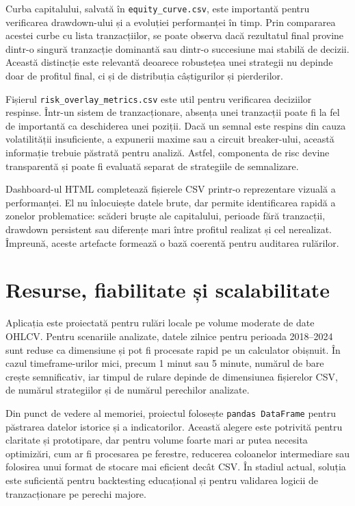 Curba capitalului, salvată în \texttt{equity\_curve.csv}, este importantă pentru verificarea drawdown-ului și a evoluției performanței în timp. Prin compararea acestei curbe cu lista tranzacțiilor, se poate observa dacă rezultatul final provine dintr-o singură tranzacție dominantă sau dintr-o succesiune mai stabilă de decizii. Această distincție este relevantă deoarece robustețea unei strategii nu depinde doar de profitul final, ci și de distribuția câștigurilor și pierderilor.

Fișierul \texttt{risk\_overlay\_metrics.csv} este util pentru verificarea deciziilor respinse. Într-un sistem de tranzacționare, absența unei tranzacții poate fi la fel de importantă ca deschiderea unei poziții. Dacă un semnal este respins din cauza volatilității insuficiente, a expunerii maxime sau a circuit breaker-ului, această informație trebuie păstrată pentru analiză. Astfel, componenta de risc devine transparentă și poate fi evaluată separat de strategiile de semnalizare.

Dashboard-ul HTML completează fișierele CSV printr-o reprezentare vizuală a performanței. El nu înlocuiește datele brute, dar permite identificarea rapidă a zonelor problematice: scăderi bruște ale capitalului, perioade fără tranzacții, drawdown persistent sau diferențe mari între profitul realizat și cel nerealizat. Împreună, aceste artefacte formează o bază coerentă pentru auditarea rulărilor.

\section{Resurse, fiabilitate și scalabilitate}
\label{cap:cap4:resurse}

Aplicația este proiectată pentru rulări locale pe volume moderate de date OHLCV. Pentru scenariile analizate, datele zilnice pentru perioada 2018--2024 sunt reduse ca dimensiune și pot fi procesate rapid pe un calculator obișnuit. În cazul timeframe-urilor mici, precum 1 minut sau 5 minute, numărul de bare crește semnificativ, iar timpul de rulare depinde de dimensiunea fișierelor CSV, de numărul strategiilor și de numărul perechilor analizate.

Din punct de vedere al memoriei, proiectul folosește \texttt{pandas DataFrame} pentru păstrarea datelor istorice și a indicatorilor. Această alegere este potrivită pentru claritate și prototipare, dar pentru volume foarte mari ar putea necesita optimizări, cum ar fi procesarea pe ferestre, reducerea coloanelor intermediare sau folosirea unui format de stocare mai eficient decât CSV. În stadiul actual, soluția este suficientă pentru backtesting educațional și pentru validarea logicii de tranzacționare pe perechi majore.

